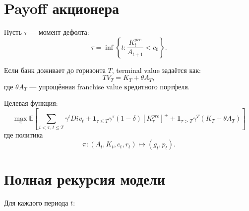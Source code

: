 \documentclass[11pt,a4paper]{article}
\newcommand{\1}{\mathbf{1}}
\newcommand{\E}{\mathbb{E}}
\newcommand{\pos}[1]{\left[#1\right]^+}
\begin{document}
\section{Payoff акционера}

Пусть $\tau$ --- момент дефолта:
\begin{equation}
    \tau = \inf\left\{t: \frac{K_t^{pre}}{A_{t+1}}<c_0\right\}.
\end{equation}

Если банк доживает до горизонта $T$, terminal value задаётся как:
\begin{equation}
    TV_T = K_T + \theta A_T,
\end{equation}
где $\theta A_T$ --- упрощённая franchise value кредитного портфеля.

Целевая функция:
\begin{equation}
\boxed{
    \max_{\pi}
    \E\left[
        \sum_{t<\tau,\,t\le T} \gamma^t Div_t
        +
        \1_{\tau\le T}\gamma^\tau (1-\delta)\pos{K_\tau^{pre}}
        +
        \1_{\tau>T}\gamma^T(K_T+\theta A_T)
    \right]
}
\end{equation}
где политика
\begin{equation}
    \pi: (A_t,K_t,c_t,r_t)\mapsto (g_t,p_t).
\end{equation}

\section{Полная рекурсия модели}

Для каждого периода $t$:
\end{document}
